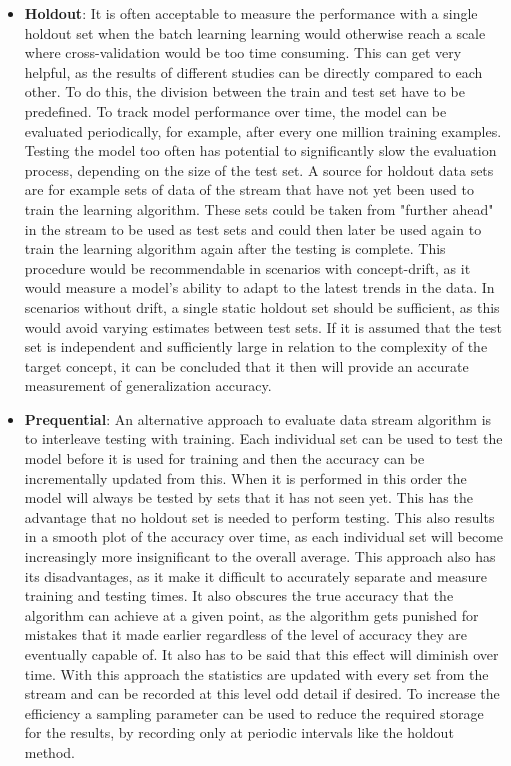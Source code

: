 \documentclass[12pt,oneside,a4paper,parskip]{scrbook}
\begin{document}
\begin{itemize}
  \item \textbf{Holdout}:
        It is often acceptable to measure the performance with a single holdout set when the batch learning learning 
        would otherwise reach a scale where cross-validation would be too time consuming.
        This can get very helpful, as the results of different studies can be directly compared to each other. 
        To do this, the division between the train and test set have to be predefined.
        To track model performance over time, the model can be evaluated periodically, for example, after every 
        one million training examples. Testing the model too often has potential to significantly slow the evaluation 
        process, depending on the size of the test set.
        A source for holdout data sets are for example sets of data of the stream that have not yet been used to train 
        the learning algorithm.
        These sets could be taken from "further ahead" in the stream to be used as test sets and could then later be 
        used again to train the learning algorithm again after the testing is complete.
        This procedure would be recommendable in scenarios with concept-drift, as it would measure a model’s ability
        to adapt to the latest trends in the data.
        In scenarios without drift, a single static holdout set should be sufficient, as this would avoid varying estimates 
        between test sets.
        If it is assumed that the test set is independent and sufficiently large in relation to the complexity of the 
        target concept, it can be concluded that it then will provide an accurate measurement of generalization accuracy.
        \cite{Bifet_datastream}
  \item \textbf{Prequential}:
        An alternative approach to evaluate data stream algorithm is to interleave testing with training. Each individual
        set can be used to test the model before it is used for training and then the accuracy can be incrementally updated
        from this. When it is performed in this order the model will always be tested by sets that it has not seen yet.
        This has the advantage that no holdout set is needed to perform testing. This also results in a smooth plot of 
        the accuracy over time, as each individual set will become increasingly more insignificant to the overall average.
        This approach also has its disadvantages, as it make it difficult to accurately separate and measure
        training and testing times. It also obscures the true accuracy that the algorithm can achieve at a given point, as the 
        algorithm gets punished for mistakes that it made earlier regardless of the level of accuracy they are eventually
        capable of. It also has to be said that this effect will diminish over time.
        With this approach the statistics are updated with every set from the stream and can be recorded at this level odd detail
        if desired. To increase the efficiency a sampling parameter can be used to reduce the required storage for the results,
        by recording only at periodic intervals like the holdout method.
        \cite{Bifet_datastream}
\end{itemize}
\end{document}
